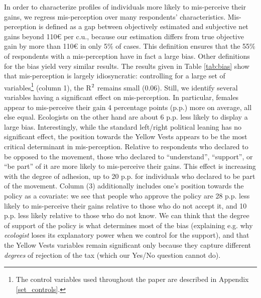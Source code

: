 \documentclass[12pt]{article} %
\begin{document}
In order to characterize profiles of individuals more likely to mis-perceive their gains, we regress mis-perception over many respondents' characteristics. Mis-perception is defined as a gap between objectively estimated and subjective net gains beyond 110\euro{} per c.u., because our estimation differs from true objective gain by more than 110\euro{} in only 5\% of cases. This definition ensures that the 55\% of respondents with a mis-perception have in fact a large bias. Other definitions for the bias yield very similar results. The results given in Table \ref{tab:bias} show that mis-perception is largely idiosyncratic: controlling for a large set of variables\footnote{The control variables used throughout the paper are described in Appendix \ref{set_controls}.} (column 1), the R$^\textnormal{2}$ remains small (0.06). Still, we identify several variables having a significant effect on mis-perception. In particular, females appear to mis-perceive their gain 4 percentage points (p.p.) more on average, all else equal. Ecologists on the other hand are about 6 p.p. less likely to display a large bias. Interestingly, while the standard left/right political leaning has no significant effect, the position towards the Yellow Vests appears to be the most critical determinant in mis-perception. Relative to respondents who declared to be opposed to the movement, those who declared to ``understand'', ``support'', or ``be part'' of it are more likely to mis-perceive their gains. This effect is increasing with the degree of adhesion, up to 20 p.p. for individuals who declared to be part of the movement. Column (3) additionally includes one's position towards the policy as a covariate: we see that people who approve the policy are 28 p.p. less likely to mis-perceive their gains relative to those who do not accept it, and 10 p.p. less likely relative to those who do not know. We can think that the degree of support of the policy is what determines most of the bias (explaining e.g. why \textit{ecologist} loses its explanatory power when we control for the support), and that the Yellow Vests variables remain significant only because they capture different \textit{degrees} of rejection of the tax (which our Yes/No question cannot do).  %
\end{document}
